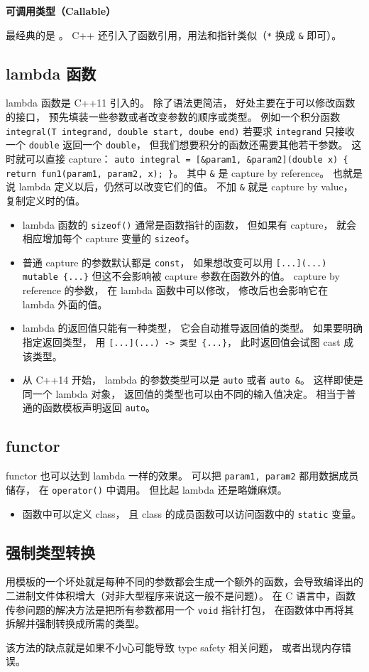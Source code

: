 

\textbf{可调用类型（Callable）}

最经典的是 。 C++ 还引入了函数引用，用法和指针类似（\verb|*| 换成 \verb|&| 即可）。

\subsection{lambda 函数}
lambda 函数是 C++11 引入的。 除了语法更简洁， 好处主要在于可以修改函数的接口， 预先填装一些参数或者改变参数的顺序或类型。 例如一个积分函数 \verb|integral(T integrand, double start, doube end)| 若要求 \verb|integrand| 只接收一个 \verb|double| 返回一个 \verb|double|， 但我们想要积分的函数还需要其他若干参数。 这时就可以直接 capture： \verb|auto integral = [&param1, &param2](double x) { return fun1(param1, param2, x); }|。 其中 \verb|&| 是 capture by reference。 也就是说 lambda 定义以后，仍然可以改变它们的值。 不加 \verb|&| 就是 capture by value， 复制定义时的值。

\begin{itemize}
\item lambda 函数的 \verb|sizeof()| 通常是函数指针的函数， 但如果有 capture， 就会相应增加每个 capture 变量的 \verb|sizeof|。
\item 普通 capture 的参数默认都是 \verb|const|， 如果想改变可以用 \verb|[...](...) mutable {...}| 但这不会影响被 capture 参数在函数外的值。 capture by reference 的参数， 在 lambda 函数中可以修改， 修改后也会影响它在 lambda 外面的值。
\item lambda 的返回值只能有一种类型， 它会自动推导返回值的类型。 如果要明确指定返回类型， 用 \verb|[...](...) -> 类型 {...}|， 此时返回值会试图 cast 成该类型。
\item 从 C++14 开始， lambda 的参数类型可以是 \verb|auto| 或者 \verb|auto &|。 这样即使是同一个 lambda 对象， 返回值的类型也可以由不同的输入值决定。 相当于普通的函数模板声明返回 \verb|auto|。
\end{itemize}

\subsection{functor}
functor 也可以达到 lambda 一样的效果。 可以把 \verb|param1, param2| 都用数据成员储存， 在 \verb|operator()| 中调用。 但比起 lambda 还是略嫌麻烦。

\begin{itemize}
\item 函数中可以定义 class， 且 class 的成员函数可以访问函数中的 \verb|static| 变量。
\end{itemize}

\subsection{强制类型转换}
用模板的一个坏处就是每种不同的参数都会生成一个额外的函数，会导致编译出的二进制文件体积增大（对非大型程序来说这一般不是问题）。 在 C 语言中，函数传参问题的解决方法是把所有参数都用一个 \verb|void| 指针打包， 在函数体中再将其拆解并强制转换成所需的类型。

该方法的缺点就是如果不小心可能导致 type safety 相关问题， 或者出现内存错误。
